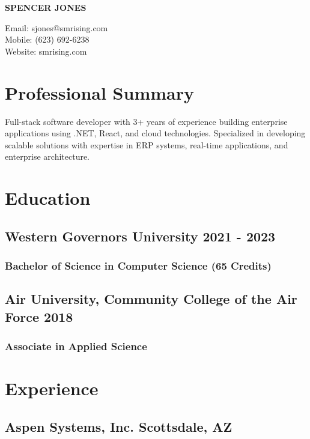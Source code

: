 \documentclass[11pt]{article} %
\begin{document}
\begin{center}
	\begin{minipage}{0.55\textwidth}
		{\Huge\bfseries SPENCER JONES}
	\end{minipage}
	\begin{minipage}{0.4\textwidth}
		\raggedleft
		Email: sjones@smrising.com \\
		Mobile: (623) 692-6238 \\
        Website: smrising.com \\
	\end{minipage} \hfill
\end{center}

\section{Professional Summary}
Full-stack software developer with 3+ years of experience building enterprise applications using .NET, React, and cloud technologies. Specialized in developing scalable solutions with expertise in ERP systems, real-time applications, and enterprise architecture.

\section{Education}
\subsection{Western Governors University \hfill 2021 - 2023}
\subsubsection{Bachelor of Science in Computer Science (65 Credits)}
\subsection{Air University, Community College of the Air Force \hfill 2018} 
\subsubsection{Associate in Applied Science}
\vspace{0.7em}
\section{Experience}

\subsection*{Aspen Systems, Inc. \hfill Scottsdale, AZ}
\end{document}

